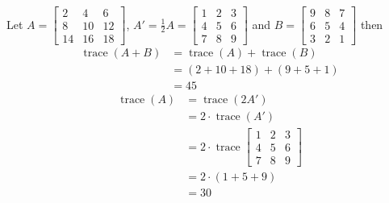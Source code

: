 \documentclass[12pt]{article}
\begin{document}
Let $A = \left[ \begin{array}{ccc}
2 & 4 & 6 \\
8 & 10 & 12 \\
14 & 16 & 18 
\end{array}\right]$,
$A' = \frac{1}{2}A = \left[\begin{array}{ccc}
1 & 2 & 3 \\
4 & 5 & 6 \\
7 & 8 & 9
\end{array}\right]$
 and $B = \left[\begin{array}{ccc}
9 & 8 & 7 \\
6 & 5 & 4 \\
3 & 2 & 1 
\end{array}\right]$ then
\begin{align*}
\operatorname{trace}(A+B) & = \operatorname{trace}(A) + \operatorname{trace}(B)\\ 
& = (2 + 10 + 18) + (9 + 5 + 1)\\ 
& = 45
\end{align*}
\begin{align*}
\operatorname{trace}(A)
& = \operatorname{trace}(2A')\\
& = 2\cdot \operatorname{trace}(A')\\
& = 2\cdot \operatorname{trace}
\left[\begin{array}{ccc}
1 & 2 & 3 \\
4 & 5 & 6 \\
7 & 8 & 9
\end{array}\right]\\
& = 2\cdot (1 + 5 + 9)\\
& = 30
\end{align*}
\end{document}
